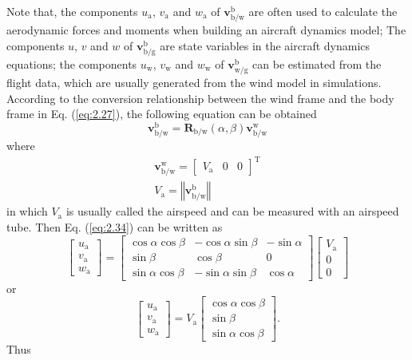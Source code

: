 Note that, the components ${{u}_{\text{a}}}$, ${{v}_{\text{a}}}$
and ${{w}_{\text{a}}}$ of $\mathbf{v}_{\text{{b}/{w}}}^{\text{b}}$
are often used to calculate the aerodynamic forces and moments when
building an aircraft dynamics model; The components $u$, $v$ and
$w$ of $\mathbf{v}_{\text{{b}/{g}}}^{\text{b}}$ are state variables
in the aircraft dynamics equations; the components ${{u}_{\text{w}}}$,
${{v}_{\text{w}}}$ and ${{w}_{\text{w}}}$ of $\mathbf{v}_{\text{{w}/{g}}}^{\text{b}}$
can be estimated from the flight data, which are usually generated
from the wind model in simulations. According to the conversion relationship
between the wind frame and the body frame in Eq. (\ref{eq:2.27}),
the following equation can be obtained 
\begin{equation}
\mathbf{v}_{\text{{b}/{w}}}^{\text{b}}={{\mathbf{R}}_{\text{b/w}}}\left(\alpha,\beta\right)\mathbf{v}_{\text{{b}/{w}}}^{\text{w}}\label{eq:2.34}
\end{equation}
where 
\[
\begin{array}{c}
\mathbf{v}_{\text{{b}/{w}}}^\text{w}=\left[\begin{array}{ccc}
{V}_{\text{a}} & 0 & 0\end{array}\right]^{\text{T}}\\
{{V}_{\text{a}}}=\left\Vert \mathbf{v}_{\text{{b}/{w}}}^{\text{b}}\right\Vert 
\end{array}
\]
in which ${{V}_{\text{a}}}$ is usually called the airspeed and can
be measured with an airspeed tube. Then Eq. (\ref{eq:2.34}) can be
written as
\begin{equation}
\left[{\begin{array}{c}
	{u_{\text{a}}}\\
	{v_{\text{a}}}\\
	{w_{\text{a}}}
	\end{array}}\right]=\left[{\begin{array}{ccc}
	{\cos\alpha\cos\beta} & {-\cos\alpha\sin\beta} & {-\sin\alpha}\\
	{\sin\beta} & {\cos\beta} & 0\\
	{\sin\alpha\cos\beta} & {-\sin\alpha\sin\beta} & {\cos\alpha}
	\end{array}}\right]\left[{\begin{array}{c}
	{V_{\text{a}}}\\
	0\\
	0
	\end{array}}\right]\label{eq:2.35}
\end{equation}
or 
\begin{equation}
\left[{\begin{array}{c}
	{u_{\text{a}}}\\
	{v_{\text{a}}}\\
	{w_{\text{a}}}
	\end{array}}\right]={V_{\text{a}}}\left[{\begin{array}{c}
	{\cos\alpha\cos\beta}\\
	{\sin\beta}\\
	{\sin\alpha\cos\beta}
	\end{array}}\right].\label{eq:2.36}
\end{equation}
Thus

